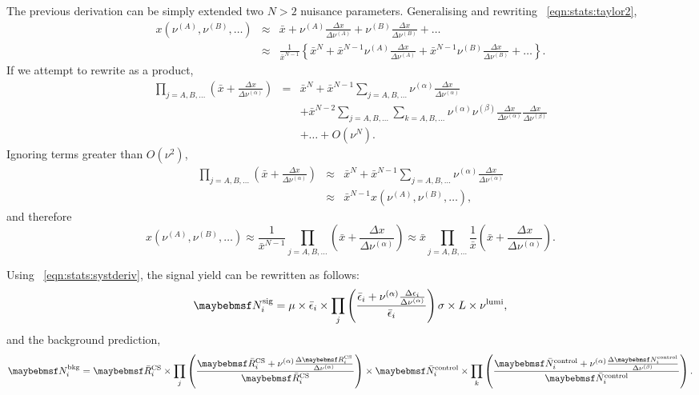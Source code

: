 The previous derivation can be simply extended two $N > 2$ nuisance
parameters. Generalising and rewriting \eqn~\ref{eqn:stats:taylor2},
\begin{eqnarray*}
x(\nu^{(A)}, \nu^{(B)}, \ldots) &\approx& \bar{x} +
\nu^{(A)}\frac{\Delta x}{\Delta\nu^{(A)}} +
\nu^{(B)}\frac{\Delta x}{\Delta\nu^{(B)}} + \ldots \\
&\approx& \frac{1}{\bar{x}^{N-1}} \left\{ \bar{x}^N +
\bar{x}^{N-1} \nu^{(A)}\frac{\Delta x}{\Delta\nu^{(A)}} +
\bar{x}^{N-1} \nu^{(B)}\frac{\Delta x}{\Delta\nu^{(B)}} + \ldots \right\}.
\end{eqnarray*}
If we attempt to rewrite as a product,
\begin{eqnarray*}
\prod_{j=A, B, \ldots} \left(\bar{x} + \frac{\Delta x}{\Delta\nu^{(\alpha)}}\right) &=&
\bar{x}^N + \bar{x}^{N-1} \sum_{j=A, B, \ldots} \nu^{(\alpha)}\frac{\Delta x}{\Delta \nu^{(\alpha)}} \\
&&+ \bar{x}^{N-2}\sum_{j=A, B, \ldots} \sum_{k=A, B, \ldots} \nu^{(\alpha)}\nu^{(\beta)}\frac{\Delta x}{\Delta
  \nu^{(\alpha)}}\frac{\Delta x}{\Delta \nu^{(\beta)}} \\
&&+ \ldots +O(\nu^N).
\end{eqnarray*}
Ignoring terms greater than $O(\nu^2)$,
\begin{eqnarray*}
\prod_{j=A, B, \ldots} \left(\bar{x} + \frac{\Delta x}{\Delta\nu^{(\alpha)}}\right) &\approx&
\bar{x}^N + \bar{x}^{N-1} \sum_{j=A, B, \ldots} \nu^{(\alpha)}\frac{\Delta x}{\Delta
  \nu^{(\alpha)}} \\
&\approx& \bar{x}^{N-1} x(\nu^{(A)}, \nu^{(B)}, \ldots),
\end{eqnarray*}
and therefore
\begin{equation}
\label{eqn:stats:systderiv}
x(\nu^{(A)}, \nu^{(B)}, \ldots) \approx \frac{1}{\bar{x}^{N-1}} \prod_{j = A, B,
  \ldots} \left(\bar{x} + \frac{\Delta x}{\Delta\nu^{(\alpha)}}\right) \approx
\bar{x} \prod_{j = A, B,
  \ldots} \frac{1}{\bar{x}}\left(\bar{x} + \frac{\Delta x}{\Delta\nu^{(\alpha)}}\right).
\end{equation}

Using \eqn~\ref{eqn:stats:systderiv}, the signal yield can be rewritten as follows:
\begin{equation*}
\NSigi = \mu \times \bar{\epsilon}_i \times \prod_{j}\left(\frac{\bar{\epsilon}_i
    + \nu^{(\alpha)}\frac{\Delta\epsilon_i}{\Delta\nu^{(\alpha)}}}{\bar{\epsilon}_i}\right) \sigma \times L \times \nu^{\textrm{lumi}},
\end{equation*}
and the background prediction,
\begin{equation*}
\NBkgi = \RbarCS_i \times \prod_{j}\left( \frac{\RbarCS_i
    + \nu^{(\alpha)}\frac{\Delta\RCSi}{\Delta\nu^{(\alpha)}}}{\RbarCS_i}\right)
\times \NbarControl_i \times \prod_{k}\left( \frac{\NbarControl_i
    + \nu^{(\alpha)}\frac{\Delta\NControli}{\Delta\nu^{(\beta)}}}{\NbarControl_i}\right).
\end{equation*}

